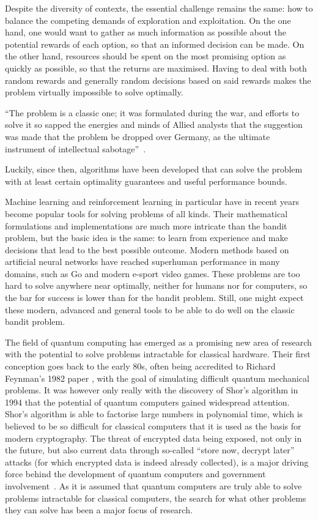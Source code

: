 Despite the diversity of contexts, the essential challenge remains the same: how to balance the competing demands of exploration and exploitation.
On the one hand, one would want to gather as much information as possible about the potential rewards of each option, so that an informed decision can be made.
On the other hand, resources should be spent on the most promising option as quickly as possible, so that the returns are maximised.
Having to deal with both random rewards and generally random decisions based on said rewards makes the problem virtually impossible to solve optimally.
\begin{displayquote}
    \enquote{The problem is a  classic one; it was formulated during the war, and efforts to solve it so sapped the energies and minds of Allied analysts that the suggestion was made that the problem be dropped over Germany, as the ultimate instrument of intellectual sabotage}~\autocite{whittle1979}.
\end{displayquote}
Luckily, since then, algorithms have been developed that can solve the problem with at least certain optimality guarantees and useful performance bounds.

Machine learning and reinforcement learning in particular have in recent years become popular tools for solving problems of all kinds.
Their mathematical formulations and implementations are much more intricate than the bandit problem, but the basic idea is the same: to learn from experience and make decisions that lead to the best possible outcome.
Modern methods based on artificial neural networks have reached superhuman performance in many domains, such as Go and modern e-sport video games.
These problems are too hard to solve anywhere near optimally, neither for humans nor for computers, so the bar for success is lower than for the bandit problem.
Still, one might expect these modern, advanced and general tools to be able to do well on the classic bandit problem.

The field of quantum computing has emerged as a promising new area of research with the potential to solve problems intractable for classical hardware.
Their first conception goes back to the early 80s, often being accredited to Richard Feynman's 1982 paper \cite{feynman1982}, with the goal of simulating difficult quantum mechanical problems.
It was however only really with the discovery of Shor's algorithm in 1994 \cite{shor1994} that the potential of quantum computers gained widespread attention.
Shor's algorithm is able to factorise large numbers in polynomial time, which is believed to be so difficult for classical computers that it is used as the basis for modern cryptography.
The threat of encrypted data being exposed, not only in the future, but also current data through so-called \enquote{store now, decrypt later} attacks (for which encrypted data is indeed already collected), is a major driving force behind the development of quantum computers and government involvement~\autocite{alagic2022, cisa2022}.
As it is assumed that quantum computers are truly able to solve problems intractable for classical computers, the search for what other problems they can solve has been a major focus of research.


